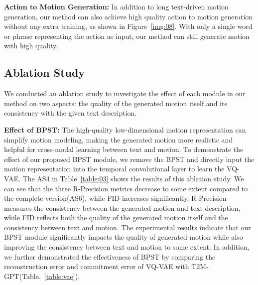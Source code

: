 \documentclass[10pt,twocolumn,letterpaper]{article}
\begin{document}
\textbf{Action to Motion Generation:}
In addition to long text-driven motion generation, our method can also achieve high quality action to motion generation without any extra training, as shown in Figure~\ref{img:08}. With only a single word or phrase representing the action as input, our method can still generate motion with high quality.




\subsection{Ablation Study}\label{ssec:ablation_study}
We conducted an ablation study to investigate the effect of each module in our method on two aspects: the quality of the generated motion itself and its consistency with the given text description. 

\textbf{Effect of BPST:}
The high-quality low-dimensional motion representation can simplify motion modeling, making the generated motion more realistic and helpful for cross-modal learning between text and motion. To demonstrate the effect of our proposed BPST module, we remove the BPST and directly input the motion representation into the temporal convolutional layer to learn the VQ-VAE. The AS4 in Table~\ref{table:03} shows the results of this ablation study. We can see that the three R-Precision metrics decrease to some extent compared to the complete version(AS6), while FID increases significantly. R-Precision measures the consistency between the generated motion and text description, while FID reflects both the quality of the generated motion itself and the consistency between text and motion. The experimental results indicate that our BPST module significantly impacts the quality of generated motion while also improving the consistency between text and motion to some extent. In addition, we further demonstrated the effectiveness of BPST by comparing the reconstruction error and commitment error of VQ-VAE with T2M-GPT(Table.~\ref{table:vae}).
\end{document}

